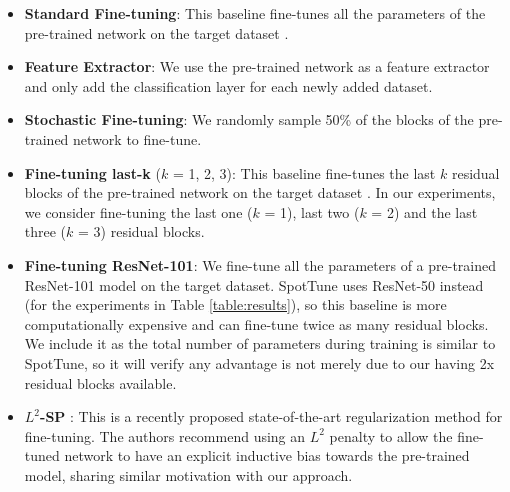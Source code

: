 \documentclass[10pt,twocolumn,letterpaper]{article}
\begin{document}
\begin{itemize} 
  \setlength\itemsep{0.01em}
    \item { \textbf{Standard Fine-tuning}}: This baseline fine-tunes all the parameters of the pre-trained network on the target dataset \cite{girshick2014rich,yosinski2014transferable}. 
    
    \item { \textbf{Feature Extractor}}: We use the pre-trained network as a feature extractor~\cite{sharif2014cnn,donahue2014decaf} and only add the classification layer for each newly added dataset.

    \item { \textbf{Stochastic Fine-tuning}}: We randomly sample 50\% of the blocks of the pre-trained network to fine-tune.
    
    \item { \textbf{Fine-tuning last-k} ($k$ = 1, 2, 3)}: This baseline fine-tunes the last $k$ residual blocks of the pre-trained network on the target dataset \cite{long2015learninglastfew,tajbakhsh2016convolutional, azizpour2016factors}. In our experiments, we consider fine-tuning the last one ($k$ = 1), last two ($k$ = 2) and the last three ($k$ = 3) residual blocks. 
    
    \item { \textbf{Fine-tuning ResNet-101}}: We fine-tune all the parameters of a pre-trained ResNet-101 model on the target dataset. SpotTune uses ResNet-50 instead (for the experiments in Table \ref{table:results}), so this baseline is more computationally expensive and can fine-tune twice as many residual blocks. %
    We include it as the total number of parameters during training is similar to SpotTune, so it will verify any advantage is not merely due to our having 2x residual blocks available.
    
    \item { \textbf{$L^2$-SP} \cite{li2018explicit}}: This is a recently proposed state-of-the-art regularization method for fine-tuning. The authors recommend using an $L^2$ penalty to allow the fine-tuned network to have an explicit inductive bias towards the pre-trained model, sharing similar motivation with our approach.
\end{itemize}
\end{document}

